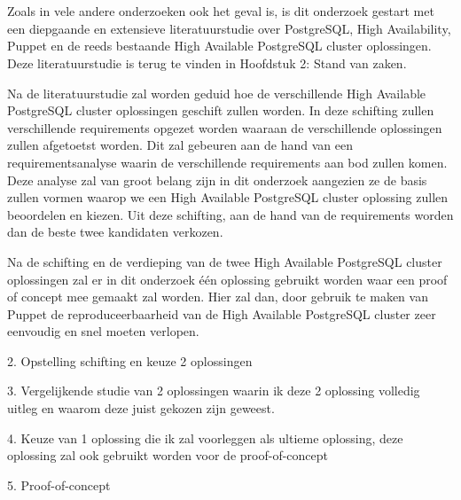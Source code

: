 
\chapter{}
\label{ch:methodologie}


Zoals in vele andere onderzoeken ook het geval is, is dit onderzoek gestart met een diepgaande en extensieve literatuurstudie over PostgreSQL, High Availability, Puppet en de reeds bestaande High Available PostgreSQL cluster oplossingen. Deze literatuurstudie is terug te vinden in Hoofdstuk 2: Stand van zaken.

Na de literatuurstudie zal worden geduid hoe de verschillende High Available PostgreSQL cluster oplossingen geschift zullen worden. In deze schifting zullen verschillende requirements opgezet worden waaraan de verschillende oplossingen zullen afgetoetst worden. Dit zal gebeuren aan de hand van een requirementsanalyse waarin de verschillende requirements aan bod zullen komen. Deze analyse zal van groot belang zijn in dit onderzoek aangezien ze de basis zullen vormen waarop we een High Available PostgreSQL cluster oplossing zullen beoordelen en kiezen.
Uit deze schifting, aan de hand van de requirements worden dan de beste twee kandidaten verkozen. %

Na de schifting en de verdieping van de twee High Available PostgreSQL cluster oplossingen zal er in dit onderzoek één oplossing gebruikt worden waar een proof of concept mee gemaakt zal worden. Hier zal dan, door gebruik te maken van Puppet de reproduceerbaarheid van de High Available PostgreSQL cluster zeer eenvoudig en snel moeten verlopen.

2. Opstelling schifting en keuze 2 oplossingen


3. Vergelijkende studie van 2 oplossingen waarin ik deze 2 oplossing volledig uitleg en waarom deze juist gekozen zijn geweest.


4. Keuze van 1 oplossing die ik zal voorleggen als ultieme oplossing, deze oplossing zal ook gebruikt worden voor de proof-of-concept

5. Proof-of-concept


